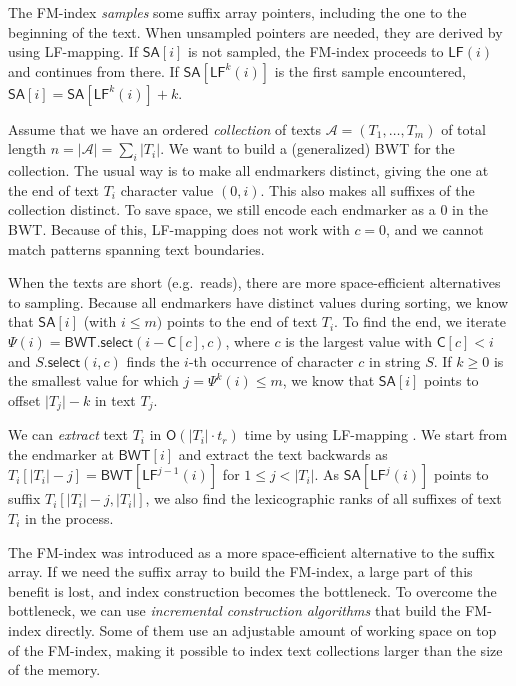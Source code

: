 \documentclass[smallabstract,smallcaptions]{dccpaper}
\newcommand{\abs}[1]{\ensuremath{\lvert #1 \rvert}}
\newcommand{\Oh}{\ensuremath{\mathsf{O}}}
\newcommand{\BWT}{\textsf{BWT}}
\newcommand{\mSA}{\ensuremath{\mathsf{SA}}}
\newcommand{\mBWT}{\ensuremath{\mathsf{BWT}}}
\newcommand{\mC}{\ensuremath{\mathsf{C}}}
\newcommand{\LF}{\textsf{LF}}
\newcommand{\mLF}{\ensuremath{\mathsf{LF}}}
\newcommand{\mselect}{\ensuremath{\mathsf{select}}}
\newcommand{\Acoll}{\ensuremath{\mathcal{A}}}
\begin{document}
The FM-index \emph{samples} some suffix array pointers, including the one to the beginning of the text. When unsampled pointers are needed, they are derived by using \LF\nobreakdash-mapping. If $\mSA[i]$ is not sampled, the FM-index proceeds to $\mLF(i)$ and continues from there. If $\mSA[\mLF^{k}(i)]$ is the first sample encountered, $\mSA[i] = \mSA[\mLF^{k}(i)] + k$.

Assume that we have an ordered \emph{collection} of texts $\Acoll = (T_{1}, \dotsc, T_{m})$ of total length $n = \abs{\Acoll} = \sum_{i} \abs{T_{i}}$. We want to build a (generalized) \BWT{} for the collection. The usual way is to make all endmarkers distinct, giving the one at the end of text $T_{i}$ character value $(0,i)$. This also makes all suffixes of the collection distinct. To save space, we still encode each endmarker as a $0$ in the \BWT{}. Because of this, \LF\nobreakdash-mapping does not work with $c = 0$, and we cannot match patterns spanning text boundaries.

When the texts are short (e.g.~reads), there are more space-efficient alternatives to sampling. Because all endmarkers have distinct values during sorting, we know that $\mSA[i]$ (with $i \le m)$ points to the end of text $T_{i}$. To find the end, we iterate $\Psi(i) = \mBWT.\mselect(i - \mC[c], c)$, where $c$ is the largest value with $\mC[c] < i$ and $S.\mselect(i,c)$ finds the $i$\nobreakdash-th occurrence of character $c$ in string $S$. If $k \ge 0$ is the smallest value for which $j = \Psi^{k}(i) \le m$, we know that $\mSA[i]$ points to offset $\abs{T_{j}} - k$ in text $T_{j}$.

We can \emph{extract} text $T_{i}$ in $\Oh(\abs{T_{i}} \cdot t_{r})$ time by using \LF\nobreakdash-mapping \cite{Burrows1994}. We start from the endmarker at $\mBWT[i]$ and extract the text backwards as $T_{i}[\abs{T_{i}} - j] = \mBWT[\LF^{j-1}(i)]$ for $1 \le j < \abs{T_{i}}$. As $\mSA[\LF^{j}(i)]$ points to suffix $T_{i}[\abs{T_{i}}-j, \abs{T_{i}}]$, we also find the lexicographic ranks of all suffixes of text $T_{i}$ in the process.


\Section{Space-efficient \BWT{} construction}

The FM-index was introduced as a more space-efficient alternative to the suffix array. If we need the suffix array to build the FM-index, a large part of this benefit is lost, and index construction becomes the bottleneck. To overcome the bottleneck, we can use \emph{incremental construction algorithms} that build the FM-index directly. Some of them use an adjustable amount of working space on top of the FM-index, making it possible to index text collections larger than the size of the memory.
\end{document}
